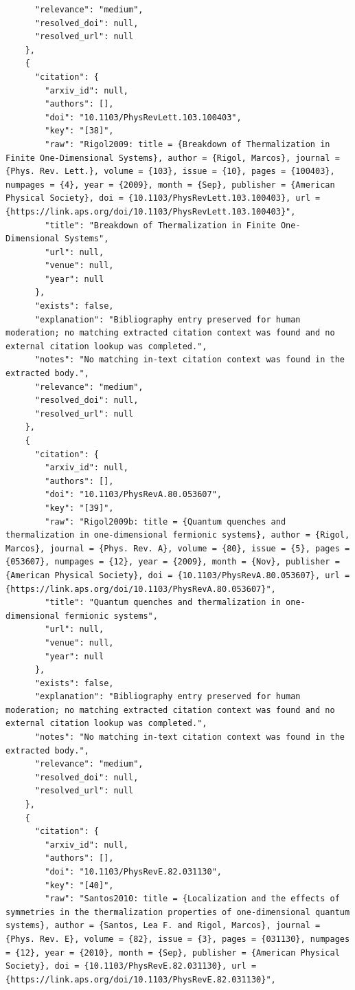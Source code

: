 \documentclass[11pt]{article}
\begin{document}
\begin{verbatim}
      "relevance": "medium",
      "resolved_doi": null,
      "resolved_url": null
    },
    {
      "citation": {
        "arxiv_id": null,
        "authors": [],
        "doi": "10.1103/PhysRevLett.103.100403",
        "key": "[38]",
        "raw": "Rigol2009: title = {Breakdown of Thermalization in Finite One-Dimensional Systems}, author = {Rigol, Marcos}, journal = {Phys. Rev. Lett.}, volume = {103}, issue = {10}, pages = {100403}, numpages = {4}, year = {2009}, month = {Sep}, publisher = {American Physical Society}, doi = {10.1103/PhysRevLett.103.100403}, url = {https://link.aps.org/doi/10.1103/PhysRevLett.103.100403}",
        "title": "Breakdown of Thermalization in Finite One-Dimensional Systems",
        "url": null,
        "venue": null,
        "year": null
      },
      "exists": false,
      "explanation": "Bibliography entry preserved for human moderation; no matching extracted citation context was found and no external citation lookup was completed.",
      "notes": "No matching in-text citation context was found in the extracted body.",
      "relevance": "medium",
      "resolved_doi": null,
      "resolved_url": null
    },
    {
      "citation": {
        "arxiv_id": null,
        "authors": [],
        "doi": "10.1103/PhysRevA.80.053607",
        "key": "[39]",
        "raw": "Rigol2009b: title = {Quantum quenches and thermalization in one-dimensional fermionic systems}, author = {Rigol, Marcos}, journal = {Phys. Rev. A}, volume = {80}, issue = {5}, pages = {053607}, numpages = {12}, year = {2009}, month = {Nov}, publisher = {American Physical Society}, doi = {10.1103/PhysRevA.80.053607}, url = {https://link.aps.org/doi/10.1103/PhysRevA.80.053607}",
        "title": "Quantum quenches and thermalization in one-dimensional fermionic systems",
        "url": null,
        "venue": null,
        "year": null
      },
      "exists": false,
      "explanation": "Bibliography entry preserved for human moderation; no matching extracted citation context was found and no external citation lookup was completed.",
      "notes": "No matching in-text citation context was found in the extracted body.",
      "relevance": "medium",
      "resolved_doi": null,
      "resolved_url": null
    },
    {
      "citation": {
        "arxiv_id": null,
        "authors": [],
        "doi": "10.1103/PhysRevE.82.031130",
        "key": "[40]",
        "raw": "Santos2010: title = {Localization and the effects of symmetries in the thermalization properties of one-dimensional quantum systems}, author = {Santos, Lea F. and Rigol, Marcos}, journal = {Phys. Rev. E}, volume = {82}, issue = {3}, pages = {031130}, numpages = {12}, year = {2010}, month = {Sep}, publisher = {American Physical Society}, doi = {10.1103/PhysRevE.82.031130}, url = {https://link.aps.org/doi/10.1103/PhysRevE.82.031130}",

\end{verbatim}
\end{document}
